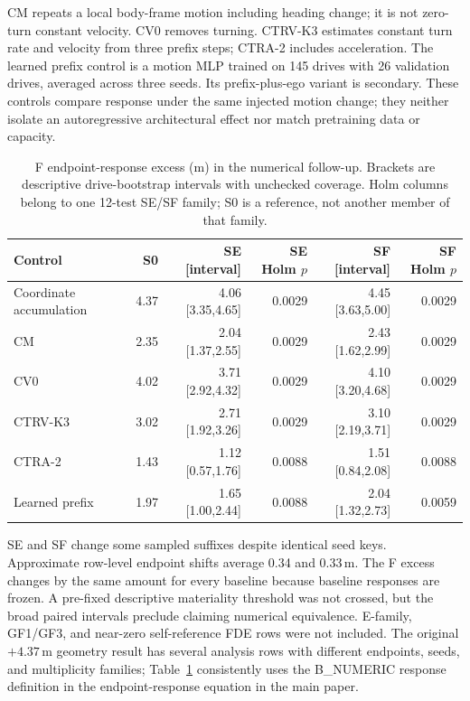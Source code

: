 CM repeats a local body-frame motion including heading change; it is not zero-turn constant velocity. CV0 removes turning. CTRV-K3 estimates constant turn rate and velocity from three prefix steps; CTRA-2 includes acceleration. The learned prefix control is a motion MLP trained on 145 drives with 26 validation drives, averaged across three seeds. Its prefix-plus-ego variant is secondary. These controls compare response under the same injected motion change; they neither isolate an autoregressive architectural effect nor match pretraining data or capacity.

\begin{table}[ht]
\centering\small
\caption{F endpoint-response excess (m) in the numerical follow-up. Brackets are descriptive drive-bootstrap intervals with unchecked coverage. Holm columns belong to one 12-test SE/SF family; S0 is a reference, not another member of that family.}
\label{tab:numeric}
\begin{tabular}{@{}lrrrrr@{}}\toprule
Control & S0 & SE [interval] & SE Holm $p$ & SF [interval] & SF Holm $p$\\\midrule
Coordinate accumulation & 4.37 & 4.06 [3.35,4.65] & 0.0029 & 4.45 [3.63,5.00] & 0.0029\\
CM & 2.35 & 2.04 [1.37,2.55] & 0.0029 & 2.43 [1.62,2.99] & 0.0029\\
CV0 & 4.02 & 3.71 [2.92,4.32] & 0.0029 & 4.10 [3.20,4.68] & 0.0029\\
CTRV-K3 & 3.02 & 2.71 [1.92,3.26] & 0.0029 & 3.10 [2.19,3.71] & 0.0029\\
CTRA-2 & 1.43 & 1.12 [0.57,1.76] & 0.0088 & 1.51 [0.84,2.08] & 0.0088\\
Learned prefix & 1.97 & 1.65 [1.00,2.44] & 0.0088 & 2.04 [1.32,2.73] & 0.0059\\\bottomrule
\end{tabular}
\end{table}

SE and SF change some sampled suffixes despite identical seed keys. Approximate row-level endpoint shifts average 0.34 and 0.33\,m. The F excess changes by the same amount for every baseline because baseline responses are frozen. A pre-fixed descriptive materiality threshold was not crossed, but the broad paired intervals preclude claiming numerical equivalence. E-family, GF1/GF3, and near-zero self-reference FDE rows were not included. The original $+4.37$\,m geometry result has several analysis rows with different endpoints, seeds, and multiplicity families; Table~\ref{tab:numeric} consistently uses the B\_NUMERIC response definition in the endpoint-response equation in the main paper.

